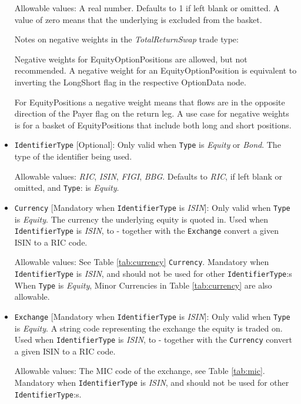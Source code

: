 \begin{itemize}
Allowable values: A real number. Defaults to 1 if left blank or omitted.  A value of zero means that the underlying is excluded from the basket.

Notes on negative weights in the \emph{TotalReturnSwap} trade type: 

Negative weights for EquityOptionPositions are allowed, but not recommended. A negative weight for an EquityOptionPosition is equivalent to inverting the LongShort flag in the respective OptionData node. 

For EquityPositions a negative weight means that flows are in the opposite direction of the Payer flag on the return leg. A use case for negative weights is for a basket of EquityPositions that include both long and short positions.

\item \lstinline!IdentifierType! [Optional]:
Only valid when \lstinline!Type! is  \emph{Equity} or \emph{Bond}. The type of the identifier being used.

Allowable values:  \emph{RIC}, \emph{ISIN}, \emph{FIGI}, \emph{BBG}. Defaults to \emph{RIC}, if left blank or omitted, and \lstinline!Type!: is  \emph{Equity}.

\item \lstinline!Currency! [Mandatory when \lstinline!IdentifierType! is  \emph{ISIN}]: Only valid when \lstinline!Type! is  \emph{Equity}. The currency the underlying equity is quoted in. Used when \lstinline!IdentifierType! is  \emph{ISIN}, to - together with the \lstinline!Exchange!  convert a given ISIN to a RIC code.  

Allowable values: See Table \ref{tab:currency} \lstinline!Currency!. Mandatory when \lstinline!IdentifierType! is  \emph{ISIN}, and should not be used for other  \lstinline!IdentifierType!:s  When \lstinline!Type! is \emph{Equity}, Minor Currencies in Table \ref{tab:currency} are also allowable.

\item \lstinline!Exchange! [Mandatory when \lstinline!IdentifierType! is  \emph{ISIN}]:
Only valid when \lstinline!Type! is  \emph{Equity}. A string code representing the exchange the equity is traded on. Used when \lstinline!IdentifierType! is  \emph{ISIN}, to - together with the \lstinline!Currency!  convert a given ISIN to a RIC code.  

Allowable values:  The MIC code of the exchange, see Table \ref{tab:mic}. Mandatory when \lstinline!IdentifierType! is  \emph{ISIN}, and should not be used for other  \lstinline!IdentifierType!:s.


\end{itemize}

